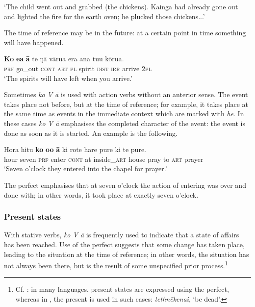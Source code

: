 \glt 
‘The child went out and grabbed (the chickens). Kainga had already gone out and lighted the fire for the earth oven; he plucked those chickens...’ \textstyleExampleref{[Ley-8-53.004]}
\z

The time of reference may be in the future: at a certain point in time something will have happened. 

\ea\label{ex:7.60}
\gll \textbf{Ko} \textbf{e{\ꞌ}a} \textbf{{\ꞌ}ā} te ŋā vārua era ana tu{\ꞌ}u kōrua. \\
\textsc{prf} go\_out \textsc{cont} \textsc{art} \textsc{pl} spirit \textsc{dist} \textsc{irr} arrive \textsc{2pl} \\

\glt 
‘The spirits will have left when you arrive.’ \textstyleExampleref{[R310.273]} 
\z

Sometimes \textit{ko V {\ꞌ}ā} is used with action verbs without an anterior sense. The event takes place not before, but at the time of reference; for example, it takes place at the same time as events in the immediate context which are marked with \textit{he}. In these cases \textit{ko V {\ꞌ}ā} emphasises the completed character of the event: the event is done as soon as it is started. An example is the following.

\ea\label{ex:7.61}
\gll Hora hitu \textbf{ko} \textbf{o{\ꞌ}o} \textbf{{\ꞌ}ā} ki rote hare pure ki te pure. \\
hour seven \textsc{prf} enter \textsc{cont} at inside\_\textsc{art} house pray to \textsc{art} prayer \\

\glt
‘Seven o’clock they entered into the chapel for prayer.’ \textstyleExampleref{[R210.140]} 
\z

The perfect emphasises that at seven o’clock the action of entering was over and done with; in other words, it took place at exactly seven o’clock. 

\subsubsection[Present states]{Present states}\label{sec:7.2.7.2}

With stative verbs, \textit{ko V {\ꞌ}ā} is frequently used to indicate that a state of affairs has been reached. Use of the perfect  suggests that some change has taken place, leading to the situation at the time of reference; in other words, the situation has not always been there, but is the result of some unspecified prior process.\footnote{\label{fn:334}Cf. \citet[57]{Comrie1976}: in many languages, present states are expressed using the perfect, whereas in , the present is used in such cases:  \textit{tethnēkenai},  ‘be dead’.} 


